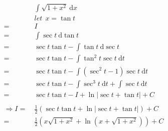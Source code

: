 \documentclass{article}
\begin{document}
	\large
	\setlength{\baselineskip}{3em}
	
	\renewcommand{\d}[1][x]{\ \text{d}#1}
	\renewcommand{\c}{+ C}
	\newcommand{\f}{\frac}
	
	\begin{align*}
		&\ \int \sqrt{1 + x^2} \d
		\\
		&\ let\ \ x = \tan{t}
		\\
		= &\ I
		\\
		= &\ \int \sec{t} \d[\tan{t}]
		\\
		= &\ \sec{t} \tan{t} - \int \tan{t} \d[\sec{t}]
		\\
		= &\ \sec{t} \tan{t} - \int \tan^2{t} \sec{t} \d[t]
		\\
		= &\ \sec{t} \tan{t} - \int (\sec^2{t} - 1) \sec{t} \d[t]
		\\
		= &\ \sec{t} \tan{t} - \int \sec^3{t} \d[t] + \int \sec{t} \d[t]
		\\
		= &\ \sec{t} \tan{t} - I + \ln{|\sec{t} + \tan{t}|} \c
		\\
		\\
		\Rightarrow I = &\ \f{1}{2} (\sec{t} \tan{t} + \ln{|\sec{t} + \tan{t}|}) \c
		\\
		= &\ \f{1}{2} (x \sqrt{1 + x^2} + \ln{(x + \sqrt{1 + x^2})}) \c 
	\end{align*}
\end{document}
